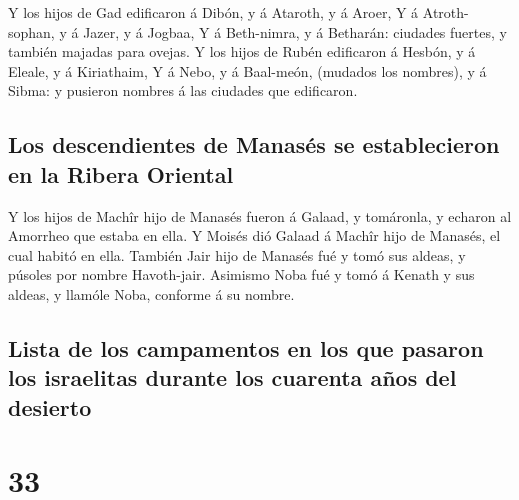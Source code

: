  Y los hijos de Gad edificaron á Dibón, y á Ataroth, y á
Aroer,  Y á Atroth-sophan, y á Jazer, y á Jogbaa,
 Y á Beth-nimra, y á Betharán: ciudades fuertes, y
también majadas para ovejas.  Y los hijos de Rubén
edificaron á Hesbón, y á Eleale, y á Kiriathaim,  Y á
Nebo, y á Baal-meón, (mudados los nombres), y á Sibma: y pusieron
nombres á las ciudades que edificaron.

\hypertarget{los-descendientes-de-manasuxe9s-se-establecieron-en-la-ribera-oriental}{%
\subsection{Los descendientes de Manasés se establecieron en la Ribera
Oriental}\label{los-descendientes-de-manasuxe9s-se-establecieron-en-la-ribera-oriental}}

 Y los hijos de Machîr hijo de Manasés fueron á Galaad, y
tomáronla, y echaron al Amorrheo que estaba en ella.  Y
Moisés dió Galaad á Machîr hijo de Manasés, el cual habitó en ella.
 También Jair hijo de Manasés fué y tomó sus aldeas, y
púsoles por nombre Havoth-jair.  Asimismo Noba fué y tomó
á Kenath y sus aldeas, y llamóle Noba, conforme á su nombre.

\hypertarget{lista-de-los-campamentos-en-los-que-pasaron-los-israelitas-durante-los-cuarenta-auxf1os-del-desierto}{%
\subsection{Lista de los campamentos en los que pasaron los israelitas
durante los cuarenta años del
desierto}\label{lista-de-los-campamentos-en-los-que-pasaron-los-israelitas-durante-los-cuarenta-auxf1os-del-desierto}}

\hypertarget{section-04-33}{%
\section{33}\label{section-04-33}}

